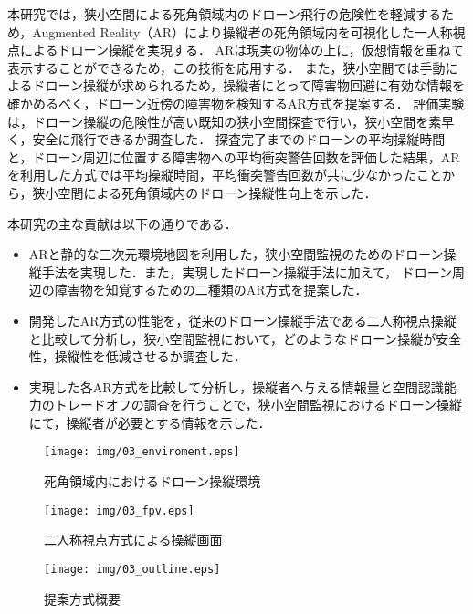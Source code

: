 \documentclass[submit, sigrecommended]{ipsj}
\begin{document}
\par
本研究では，狭小空間による死角領域内のドローン飛行の危険性を軽減するため，Augmented Reality（AR）により操縦者の死角領域内を可視化した一人称視点によるドローン操縦を実現する．
ARは現実の物体の上に，仮想情報を重ねて表示することができるため，この技術を応用する\cite{article-ar03}\cite{article-ar04}．
また，狭小空間では手動によるドローン操縦が求められるため，操縦者にとって障害物回避に有効な情報を確かめるべく，ドローン近傍の障害物を検知するAR方式を提案する．
評価実験は，ドローン操縦の危険性が高い既知の狭小空間探査で行い，狭小空間を素早く，安全に飛行できるか調査した．
探査完了までのドローンの平均操縦時間と，ドローン周辺に位置する障害物への平均衝突警告回数を評価した結果，ARを利用した方式では平均操縦時間，平均衝突警告回数が共に少なかったことから，狭小空間による死角領域内のドローン操縦性向上を示した．
\par
本研究の主な貢献は以下の通りである．
\begin{itemize}
  \item ARと静的な三次元環境地図を利用した，狭小空間監視のためのドローン操縦手法を実現した\cite{article-ar05}．また，実現したドローン操縦手法に加えて，
  ドローン周辺の障害物を知覚するための二種類のAR方式を提案した．
  \item 開発したAR方式の性能を，従来のドローン操縦手法である二人称視点操縦と比較して分析し，狭小空間監視において，どのようなドローン操縦が安全性，操縦性を低減させるか調査した．
  \item 実現した各AR方式を比較して分析し，操縦者へ与える情報量と空間認識能力のトレードオフの調査を行うことで，狭小空間監視におけるドローン操縦にて，操縦者が必要とする情報を示した．
\end{itemize}

\begin{figure}[tb]
  \centering
  \texttt{[image: img/03\_enviroment.eps]}
  \caption{死角領域内におけるドローン操縦環境}
  \label{fig:03_enviroment}
  \end{figure}
  
  \begin{figure}[tb]
    \centering
    \texttt{[image: img/03\_fpv.eps]}
    \caption{二人称視点方式による操縦画面}
    \label{fig:03_FPV}
  \end{figure}
  
  \begin{figure}[tb]
  \centering
  \texttt{[image: img/03\_outline.eps]}
  \caption{提案方式概要}
  \label{fig:03_outline}
  \end{figure}
\end{document}
